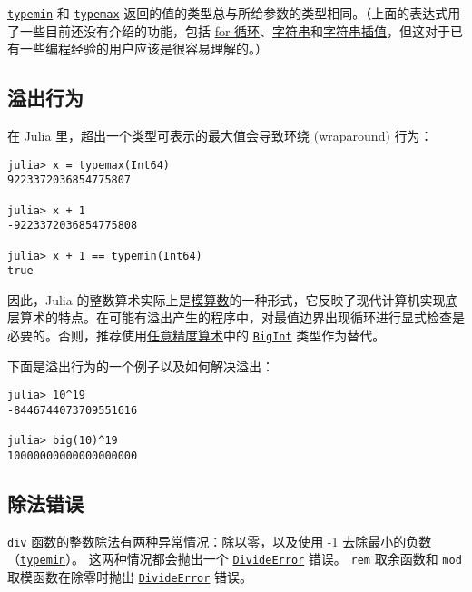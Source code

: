 \hyperlink{3613894539247233488}{\texttt{typemin}} 和 \hyperlink{17760305803764597758}{\texttt{typemax}} 返回的值的类型总与所给参数的类型相同。（上面的表达式用了一些目前还没有介绍的功能，包括 \hyperlink{9034109510149997190}{for 循环}、\hyperlink{205866387929607333}{字符串}和\hyperlink{4452850363638134205}{字符串插值}，但这对于已有一些编程经验的用户应该是很容易理解的。）



\hypertarget{7600249066838051055}{}


\subsection{溢出行为}



在 Julia 里，超出一个类型可表示的最大值会导致环绕 (wraparound) 行为：




\begin{verbatim}
julia> x = typemax(Int64)
9223372036854775807

julia> x + 1
-9223372036854775808

julia> x + 1 == typemin(Int64)
true
\end{verbatim}



因此，Julia 的整数算术实际上是\href{https://en.wikipedia.org/wiki/Modular\_arithmetic}{模算数}的一种形式，它反映了现代计算机实现底层算术的特点。在可能有溢出产生的程序中，对最值边界出现循环进行显式检查是必要的。否则，推荐使用\hyperlink{7030973523078279877}{任意精度算术}中的 \hyperlink{423405808990690832}{\texttt{BigInt}} 类型作为替代。



下面是溢出行为的一个例子以及如何解决溢出：




\begin{verbatim}
julia> 10^19
-8446744073709551616

julia> big(10)^19
10000000000000000000
\end{verbatim}



\hypertarget{18099425100953658872}{}


\subsection{除法错误}



\texttt{div} 函数的整数除法有两种异常情况：除以零，以及使用 -1 去除最小的负数（\hyperlink{3613894539247233488}{\texttt{typemin}}）。 这两种情况都会抛出一个 \hyperlink{4168463413201806292}{\texttt{DivideError}} 错误。 \texttt{rem} 取余函数和 \texttt{mod} 取模函数在除零时抛出 \hyperlink{4168463413201806292}{\texttt{DivideError}} 错误。



